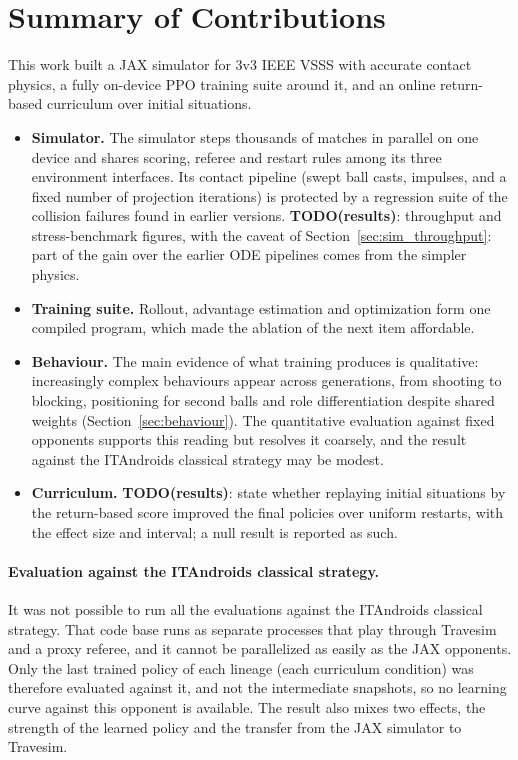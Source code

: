 
\section{Summary of Contributions}
\label{sec:conclusion}

This work built a JAX simulator for 3v3 IEEE VSSS with accurate contact physics, a fully on-device PPO training suite around it, and an online return-based curriculum over initial situations.
\begin{itemize}
  \item \textbf{Simulator.}  The simulator steps thousands of matches in parallel on one device and shares scoring, referee and restart rules among its three environment interfaces.  Its contact pipeline (swept ball casts, impulses, and a
        fixed number of projection iterations) is protected by a regression suite of the collision failures found in earlier versions.  \textbf{TODO(results)}: throughput and stress-benchmark figures, with the caveat of Section~\ref{sec:sim_throughput}: part of the gain over the earlier ODE pipelines comes from the simpler physics.
  \item \textbf{Training suite.}  Rollout, advantage estimation and optimization form one compiled program, which made the ablation of the next item affordable.
  \item \textbf{Behaviour.}  The main evidence of what training produces is qualitative: increasingly complex behaviours appear across generations, from shooting to blocking, positioning for second balls and role differentiation despite shared weights (Section~\ref{sec:behaviour}).  The quantitative evaluation against fixed opponents supports this reading but resolves it coarsely, and the result against the ITAndroids classical strategy may be modest.
  \item \textbf{Curriculum.}  \textbf{TODO(results)}: state whether replaying initial situations by the return-based score improved the final policies over uniform restarts, with the effect size and interval; a null result is reported as such.
\end{itemize}

\paragraph{Evaluation against the ITAndroids classical strategy.}
It was not possible to run all the evaluations against the ITAndroids classical strategy.  That code base runs as separate processes that play through Travesim and a proxy referee, and it cannot be parallelized as easily as the JAX opponents.
Only the last trained policy of each lineage (each curriculum condition) was therefore evaluated against it, and not the intermediate snapshots, so no learning curve against this opponent is available.  The result also mixes two effects, the strength of the learned policy and the transfer from the JAX simulator to Travesim.

